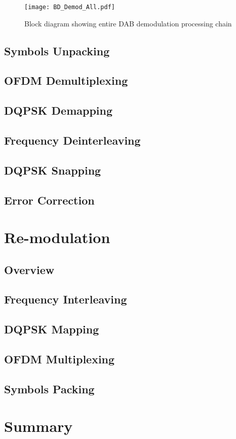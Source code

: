 \documentclass[class=report,11pt,crop=false]{standalone}
\begin{document}
\begin{figure}[htbp]
    \centering
    \texttt{[image: BD\_Demod\_All.pdf]}
    \caption{Block diagram showing entire DAB demodulation processing chain}
    \label{fig:BD_Demod_All}
\end{figure}

\subsection{Symbols Unpacking}
\subsection{OFDM Demultiplexing}
\subsection{DQPSK Demapping}
\subsection{Frequency Deinterleaving}
\subsection{DQPSK Snapping}
\subsection{Error Correction}

\section{Re-modulation}
\subsection{Overview}
\subsection{Frequency Interleaving}
\subsection{DQPSK Mapping}
\subsection{OFDM Multiplexing}
\subsection{Symbols Packing}

\section{Summary}

\ifstandalone

\printnoidxglossary[type=\acronymtype,nonumberlist]
\fi
\end{document}

